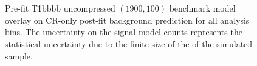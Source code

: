 \begin{figure}[!h]
{        \label{fig:T1bbbb_uncompressed_MR_4j}
    } \\
     ~~
     \\
    \caption{
        Pre-fit T1bbbb uncompressed $(1900,100)$ benchmark model overlay on
        CR-only post-fit background prediction for all analysis bins. The
        uncertainty on the signal model counts represents the statistical
        uncertainty due to the finite size of the of the simulated sample.
    }
    \label{fig:T1bbbb_uncompressed_MR}
\end{figure}

